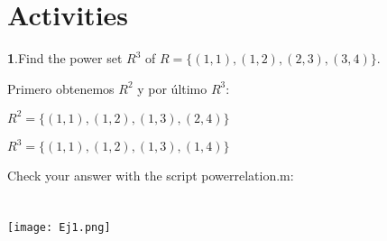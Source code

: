 \documentclass[12pt, a4paper]{article}
\begin{document}
\section* {Activities}
\textbf{1}.Find  the  power  set
$R^3$ of $R =\{(1,1),(1,2),(2,3),(3,4)\}$.


Primero obtenemos $R^2$ y por \'ultimo $R^3$:

$R^2 = \{(1,1),(1,2),(1,3),(2,4)\}$

$R^3 = \{(1,1),(1,2),(1,3),(1,4)\}$


Check your answer with the script powerrelation.m:\section*{}\texttt{[image: Ej1.png]}
\end{document}
